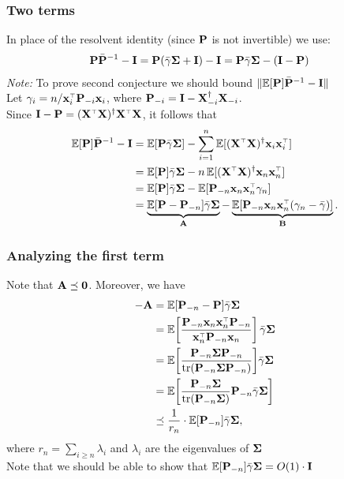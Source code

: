 \documentclass[10pt]{beamer}
\begin{document}
\begin{frame}
  \frametitle{Two terms}
In place of the resolvent identity (since $\P$ is not invertible) we use:
  \begin{align*}
\P\bar\P^{-1}-\I &= \P(\bar\gamma\Sigmab+\I) -
    \I
    =\P\bar\gamma\Sigmab - (\I-\P) 
  \end{align*}
  \textit{Note:} To prove second conjecture we should bound $\|\E[\P]\bar\P^{-1}-\I\|$\\[2mm]
  Let $\gamma_i = n/\x_i^\top\P_{-i}\x_i$, where
$\P_{-i}=\I-\X_{-i}^\dagger\X_{-i}$. \\
Since $\I-\P=(\X^\top\X)^\dagger\X^\top\X$, it follows that
  \begin{align*}
    \E[\P]\bar\P^{-1}-\I
&=\E[\P\bar\gamma\Sigmab] -
\sum_{i=1}^n\E[(\X^\top\X)^\dagger\x_i\x_i^\top]\\
&=\E[\P]\bar\gamma\Sigmab-n\,\E[(\X^\top\X)^\dagger\x_n\x_n^\top]\\
&=\E[\P]\bar\gamma\Sigmab-\E[\P_{-n}\x_n\x_n^\top\gamma_n]\\
&=\underbrace{\E[\P-\P_{-n}]\bar\gamma\Sigmab}_{\A} -
\underbrace{\E[\P_{-n}\x_n\x_n^\top(\gamma_n-\bar\gamma)]}_{\B}.
  \end{align*}
\end{frame}

\begin{frame}
  \frametitle{Analyzing the first term}
Note that $\A\preceq \zero$. Moreover, we have
  \begin{align*}
    -\A
    &=\E[\P_{-n}-\P]\bar\gamma\Sigmab
    \\
    &=\E\bigg[\frac{\P_{-n}\x_n\x_n^\top\P_{-n}}{\x_n^\top\P_{-n}\x_n}\bigg]
      \,\bar\gamma\Sigmab\\
    &=\E\bigg[\frac{\P_{-n}\Sigmab\P_{-n}}{\tr(\P_{-n}\Sigmab\P_{-n})}\bigg]\bar\gamma\Sigmab\\
    &=\E\bigg[\frac{\P_{-n}\Sigmab}{\tr(\P_{-n}\Sigmab)}
      \P_{-n}\bar\gamma\Sigmab\bigg]\\
    &\preceq \frac1{r_n}\cdot\E[\P_{-n}]\bar\gamma\Sigmab,
  \end{align*}
  where $r_n = \sum_{i\geq n}\lambda_i$ and $\lambda_i$ are the
  eigenvalues of $\Sigmab$\\
  Note that we should be able to show that
  $\E[\P_{-n}]\bar\gamma\Sigmab= O(1)\cdot \I$
\end{frame}
\end{document}

